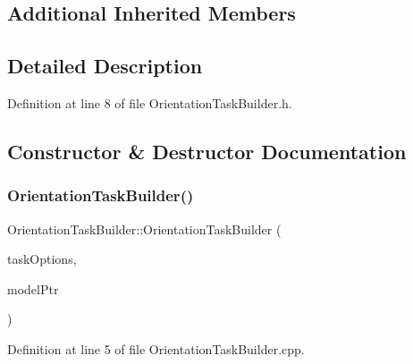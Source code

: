 \subsection*{Additional Inherited Members}


\subsection{Detailed Description}


Definition at line 8 of file Orientation\+Task\+Builder.\+h.



\subsection{Constructor \& Destructor Documentation}
\hypertarget{classocra_1_1OrientationTaskBuilder_ae21c16c5b7c2f47aaff15a33cc49a337}{}\label{classocra_1_1OrientationTaskBuilder_ae21c16c5b7c2f47aaff15a33cc49a337} 
\subsubsection{\texorpdfstring{Orientation\+Task\+Builder()}{OrientationTaskBuilder()}}
{\footnotesize\ttfamily Orientation\+Task\+Builder\+::\+Orientation\+Task\+Builder (\begin{DoxyParamCaption}\item[{const \hyperlink{classocra_1_1TaskBuilderOptions}{Task\+Builder\+Options} \&}]{task\+Options,  }\item[{Model\+::\+Ptr}]{model\+Ptr }\end{DoxyParamCaption})}



Definition at line 5 of file Orientation\+Task\+Builder.\+cpp.

\hypertarget{classocra_1_1OrientationTaskBuilder_a15053032636ee9416465134314a18226}{}\label{classocra_1_1OrientationTaskBuilder_a15053032636ee9416465134314a18226} 
